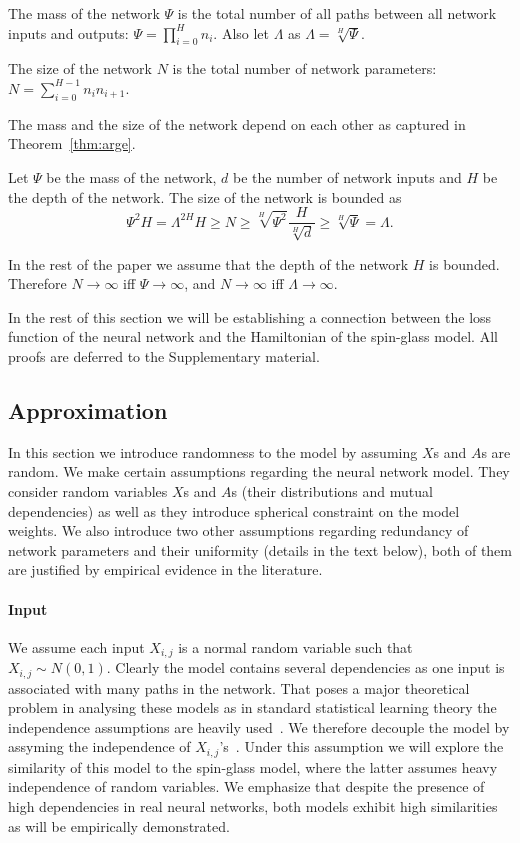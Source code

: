\documentclass[twoside]{article}
\begin{document}
\begin{definition}
The mass of the network $\Psi$ is the total number of all paths between all network inputs and outputs: $\Psi = \prod_{i=0}^Hn_i$. Also let $\Lambda$ as $\Lambda = \sqrt[H]{\Psi}$.
\end{definition}

\begin{definition}
The size of the network $N$ is the total number of network parameters: $N = \sum_{i=0}^{H-1}n_in_{i+1}$.
\end{definition}

The mass and the size of the network depend on each other as captured in Theorem~\ref{thm:arge}.
\begin{theorem}
Let $\Psi$ be the mass of the network, $d$ be the number of network inputs and $H$ be the depth of the network. The size of the network is bounded as
\[\Psi^2H = \Lambda^{2H}H \geq N \geq \sqrt[H]{\Psi^2}\frac{H}{\sqrt[H]{d}} \geq \sqrt[H]{\Psi} = \Lambda.
\]
\label{thm:arge}
\end{theorem}
In the rest of the paper we assume that the depth of the network $H$ is bounded. Therefore $N \rightarrow \infty$ iff $\Psi \rightarrow \infty$, and $N \rightarrow \infty$ iff $\Lambda \rightarrow \infty$.

In the rest of this section we will be establishing a connection between the loss function of the neural network and the Hamiltonian of the spin-glass model. All proofs are deferred to the Supplementary material.

\subsection{Approximation}

In this section we introduce randomness to the model by assuming $X$s and $A$s are random. We make certain assumptions regarding the neural network model. They consider random variables $X$s and $A$s (their distributions and mutual dependencies) as well as they introduce spherical constraint on the model weights. We also introduce two other assumptions regarding redundancy of network parameters and their uniformity (details in the text below), both of them are justified by empirical evidence in the literature. 

\paragraph{Input}
We assume each input $X_{i,j}$ is a normal random variable such that $X_{i,j}\sim N(0,1)$. Clearly the model contains several dependencies as one input is associated with many paths in the network. That poses a major theoretical problem in analysing these models as in standard statistical learning theory the independence assumptions are heavily used~\cite{hastie01statisticallearning}. We therefore decouple the model by assyming the independence of $X_{i,j}$'s~\cite{opac-b1095246}. Under this assumption we will explore the similarity of this model to the spin-glass model, where the latter assumes heavy independence of random variables. We emphasize that despite the presence of high dependencies in real neural networks, both models exhibit high similarities as will be empirically demonstrated. 
\end{document}
